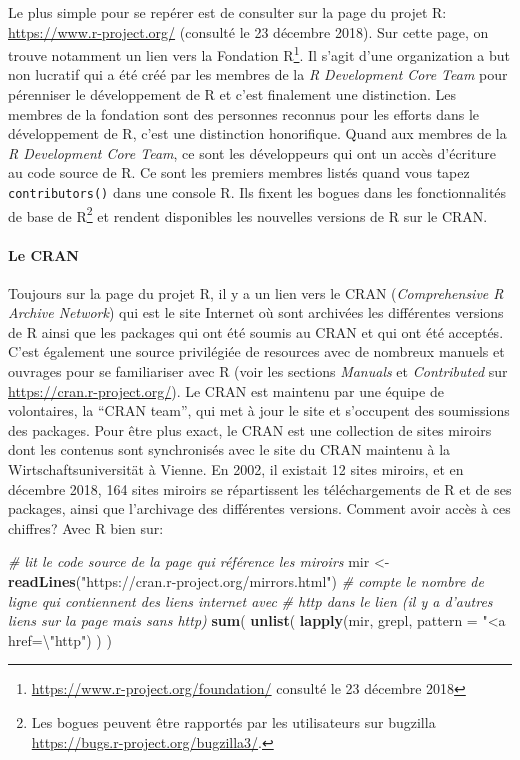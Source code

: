 \documentclass[]{article}
\newenvironment{Shaded}{\begin{snugshade}}{\end{snugshade}}
\newcommand{\CharTok}[1]{\textcolor[rgb]{0.31,0.60,0.02}{#1}}
\newcommand{\CommentTok}[1]{\textcolor[rgb]{0.56,0.35,0.01}{\textit{#1}}}
\newcommand{\DataTypeTok}[1]{\textcolor[rgb]{0.13,0.29,0.53}{#1}}
\newcommand{\KeywordTok}[1]{\textcolor[rgb]{0.13,0.29,0.53}{\textbf{#1}}}
\newcommand{\NormalTok}[1]{#1}
\newcommand{\StringTok}[1]{\textcolor[rgb]{0.31,0.60,0.02}{#1}}
\let\oldparagraph\paragraph
\renewcommand{\paragraph}[1]{\oldparagraph{#1}\mbox{}}
\begin{document}
Le plus simple pour se repérer est de consulter sur la page du projet R: \url{https://www.r-project.org/} (consulté le 23 décembre 2018). Sur cette page, on trouve notamment un lien vers la Fondation R\footnote{\url{https://www.r-project.org/foundation/} consulté le 23 décembre 2018}. Il s'agit d'une organization a but non lucratif qui a été créé par les membres de la \emph{R Development Core Team} pour pérenniser le développement de R et c'est finalement une distinction. Les membres de la fondation sont des personnes reconnus pour les efforts dans le développement de R, c'est une distinction honorifique. Quand aux membres de la \emph{R Development Core Team}, ce sont les développeurs qui ont un accès d'écriture au code source de R. Ce sont les premiers membres listés quand vous tapez \texttt{contributors()} dans une console R. Ils fixent les bogues dans les fonctionnalités de base de R\footnote{Les bogues peuvent être rapportés par les utilisateurs sur bugzilla \url{https://bugs.r-project.org/bugzilla3/}.} et rendent disponibles les nouvelles versions de R sur le CRAN.

\hypertarget{le-cran}{%
\paragraph{Le CRAN}\label{le-cran}}

Toujours sur la page du projet R, il y a un lien vers le CRAN (\emph{Comprehensive R Archive Network}) qui est le site Internet où sont archivées les différentes versions de R ainsi que les packages qui ont été soumis au CRAN et qui ont été acceptés. C'est également une source privilégiée de resources avec de nombreux manuels et ouvrages pour se familiariser avec R (voir les sections \emph{Manuals} et \emph{Contributed} sur \url{https://cran.r-project.org/}). Le CRAN est maintenu par une équipe de volontaires, la ``CRAN team'', qui met à jour le site et s'occupent des soumissions des packages. Pour être plus exact, le CRAN est une collection de sites miroirs dont les contenus sont synchronisés avec le site du CRAN maintenu à la Wirtschaftsuniversität à Vienne. En 2002, il existait 12 sites miroirs, et en
décembre 2018, 164 sites miroirs se répartissent les téléchargements de R et de ses packages, ainsi que l'archivage des différentes versions. Comment avoir accès à ces chiffres? Avec R bien sur:

\begin{Shaded}
\begin{Highlighting}[]
\CommentTok{# lit le code source de la page qui référence les miroirs}
\NormalTok{mir <-}\StringTok{ }\KeywordTok{readLines}\NormalTok{(}\StringTok{"https://cran.r-project.org/mirrors.html"}\NormalTok{)}
\CommentTok{# compte le nombre de ligne qui contiennent des liens internet avec}
\CommentTok{# http dans le lien (il y a d'autres liens sur la page mais sans http)}
\KeywordTok{sum}\NormalTok{(}
  \KeywordTok{unlist}\NormalTok{(}
    \KeywordTok{lapply}\NormalTok{(mir, grepl, }\DataTypeTok{pattern =} \StringTok{"<a href=}\CharTok{\textbackslash{}"}\StringTok{http"}\NormalTok{)}
\NormalTok{  )}
\NormalTok{)}
\end{Highlighting}
\end{Shaded}
\end{document}
